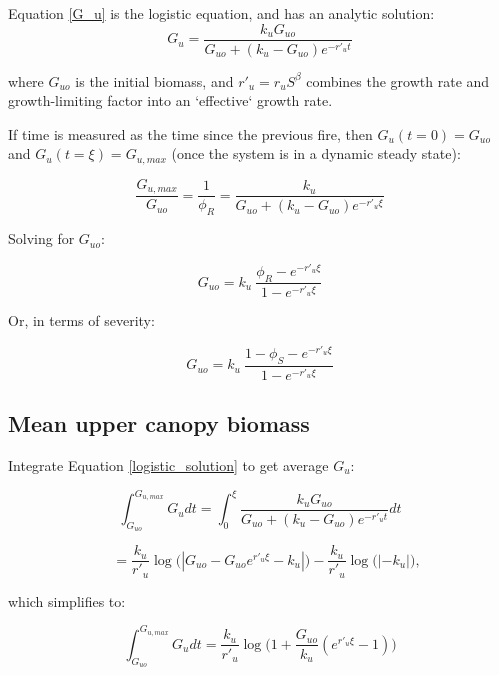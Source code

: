 \documentclass[12pt]{article}
\begin{document}
Equation \ref{G_u}  is the logistic equation, and  has an analytic solution:
\begin{equation}
    G_u = \frac{k_u G_{uo}}{G_{uo} +(k_u-G_{uo}) e^{-r'_u t}}
    \label{logistic_solution}
\end{equation}

where  $G_{uo}$  is the initial biomass, and $r'_u =  r_u S^\beta  $  combines the growth rate and growth-limiting factor into an `effective` growth rate.  

If time is measured as the time since the previous fire, then $G_u(t = 0) = G_{uo}$ and  $G_u(t = \xi) = G_{u,max}$  (once the system is in a dynamic steady state):

\begin{equation}
    \frac{G_{u,max}}{G_{uo}} = \frac{1}{\phi_R} =  \frac{k_u }{G_{uo} +(k_u-G_{uo}) e^{-r'_u \xi}}
\end{equation}

 Solving for $G_{uo}$:
 
\begin{equation}
  G_{uo} =  k_u \  \frac{\phi_R - e^{-r'_u \xi} }{1 - e^{-r'_u \xi}}
\end{equation}

Or, in terms of severity:

\begin{equation}
  G_{uo} =  k_u \   \frac{1- \phi_S - e^{-r'_u \xi} }{1 - e^{-r'_u \xi}}
  \label{G_uo}
\end{equation}

\subsection*{Mean upper canopy biomass}

Integrate Equation \ref{logistic_solution} to get average $G_u$:

\begin{equation*}
 \int_{G_{uo}}^{G_{u,max}} G_u dt = 
 \int_{0}^\xi \frac{k_u G_{uo}}{G_{uo} +(k_u-G_{uo}) e^{- r'_u t}}dt
\end{equation*}

\begin{equation*}
 \quad  =\frac{k_u}{r'_u}\log \big(| G_{uo} - G_{uo} e^{r'_u\xi}  - k_u | \big)
  - \frac{k_u}{r'_u}\log \big(|  - k_u | \big),
\end{equation*}


which simplifies to:

\begin{equation*}
 \int_{G_{uo}}^{G_{u,max}} G_u dt =
 		 \frac{k_u}{r'_u}\log \big(1 + \frac{G_{uo}}{k_u}( e^{r'_u \xi}-1)\big)
\end{equation*}
\end{document}
